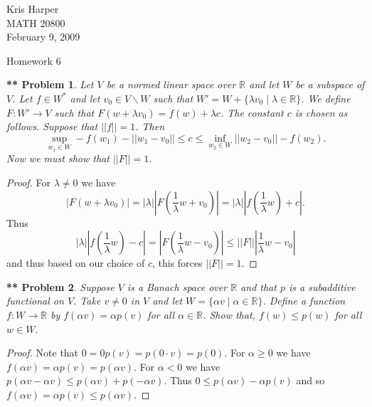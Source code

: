 \documentclass{article}
\newtheorem{**}{** Problem}
\begin{document}
\begin{flushright}
Kris Harper\\

MATH 20800\\

February 9, 2009
\end{flushright}

\begin{center}
Homework 6
\end{center}

\begin{flushleft}

\begin{**}
Let $V$ be a normed linear space over $\mathbb{R}$ and let $W$ be a subspace of $V$. Let $f \in W^*$ and let $v_0 \in V \backslash W$ such that $W' = W + \{\lambda v_0 \mid \lambda \in \mathbb{R}\}$. We define $F : W' \rightarrow V$ such that $F(w + \lambda v_0) = f(w) + \lambda c$. The constant $c$ is chosen as follows. Suppose that $||f|| = 1$. Then
\[
\sup_{w_1 \in W} -f(w_1) - ||w_1 - v_0|| \leq c \leq \inf_{w_2 \in W} ||w_2 - v_0|| - f(w_2).
\]
Now we must show that $||F|| = 1$.
\end{**}
\begin{proof}
For $\lambda \neq 0$ we have
\[
|F(w + \lambda v_0)| = |\lambda| |F \left ( \frac{1}{\lambda} w + v_0 \right )| = |\lambda| |f \left ( \frac{1}{\lambda} w \right) + c|.
\]
Thus
\[
|\lambda| |f \left ( \frac{1}{\lambda} w \right) - c| = |F \left ( \frac{1}{\lambda} w - v_0 \right)| \leq ||F|| |\frac{1}{\lambda} w - v_0|
\]
and thus based on our choice of $c$, this forces $||F|| = 1$.
\end{proof}

\begin{**}
Suppose $V$ is a Banach space over $\mathbb{R}$ and that $p$ is a subadditive functional on $V$. Take $v \neq 0$ in $V$ and let $W = \{\alpha v \mid \alpha \in \mathbb{R}\}$. Define a function $f : W \rightarrow \mathbb{R}$ by $f(\alpha v) = \alpha p(v)$ for all $\alpha \in \mathbb{R}$. Show that, $f(w) \leq p (w)$ for all $w \in W$.
\end{**}
\begin{proof}
Note that $0 = 0 p(v) = p(0 \cdot v) = p(0)$. For $\alpha \geq 0$ we have $f(\alpha v) = \alpha p(v) = p (\alpha v)$. For $\alpha < 0$ we have $p(\alpha v - \alpha v) \leq p(\alpha v) + p(-\alpha v)$. Thus $0 \leq p(\alpha v) -\alpha p(v)$ and so $f(\alpha v) = \alpha p(v) \leq p(\alpha v)$.
\end{proof}


\end{flushleft}
\end{document}
